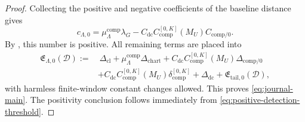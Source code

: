 \documentclass[10pt,a4paper]{amsart}
\newcommand{\calD}{\mathcal D}
\newcommand{\cl}{\mathrm{cl}}
\newcommand{\comp}{\mathrm{comp}}
\newcommand{\tail}{\mathrm{tail}}
\begin{document}
\begin{proof}
Collecting the positive and negative coefficients of the baseline distance gives
\[
        c_{\Lambda,0}
        =
        \mu_\Lambda^{\comp}\lambda_G
        -
        C_{\mathrm{dc}}C_{\comp}^{[0,K]}(M_U)C_{\comp/0}.
\]
By , this number is positive.  All remaining terms are placed into
\[
\begin{aligned}
        \mathfrak E_{\Lambda,0}(\calD)
        :=
        &\ \Delta_{\cl}
        +\mu_\Lambda^{\comp}\Delta_{\mathrm{chart}}
        +C_{\mathrm{dc}}C_{\comp}^{[0,K]}(M_U)\Delta_{\comp/0}\\
        &+C_{\mathrm{dc}}C_{\comp}^{[0,K]}(M_U)\delta_{\comp}^{[0,K]}
        +\Delta_{\mathrm{dc}}
        +\mathfrak E_{\tail,0}(\calD),
\end{aligned}
\]
with harmless finite-window constant changes allowed.  This proves \eqref{eq:journal-main}.  The positivity conclusion follows immediately from \eqref{eq:positive-detection-threshold}.
\end{proof}
\end{document}
